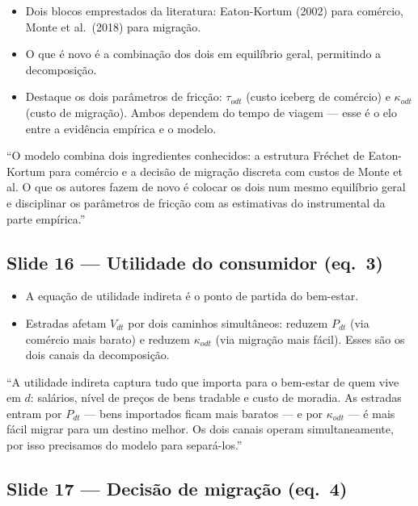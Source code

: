 \documentclass[12pt, a4paper]{article}
\begin{document}
\begin{itemize}
    \item Dois blocos emprestados da literatura: Eaton-Kortum (2002) para comércio, Monte et al.\ (2018) para migração.
    \item O que é novo é a combinação dos dois em equilíbrio geral, permitindo a decomposição.
    \item Destaque os dois parâmetros de fricção: $\tau_{odt}$ (custo iceberg de comércio) e $\kappa_{odt}$ (custo de migração). Ambos dependem do tempo de viagem --- esse é o elo entre a evidência empírica e o modelo.
\end{itemize}

\begin{mdframed}[style=sintese]
``O modelo combina dois ingredientes conhecidos: a estrutura Fréchet de Eaton-Kortum para comércio
e a decisão de migração discreta com custos de Monte et al. O que os autores fazem de novo é
colocar os dois num mesmo equilíbrio geral e disciplinar os parâmetros de fricção com as estimativas
do instrumental da parte empírica.''
\end{mdframed}

\subsection*{Slide 16 --- Utilidade do consumidor (eq.\ 3)}

\begin{itemize}
    \item A equação de utilidade indireta é o ponto de partida do bem-estar.
    \item Estradas afetam $V_{dt}$ por dois caminhos simultâneos: reduzem $P_{dt}$ (via comércio mais barato) e reduzem $\kappa_{odt}$ (via migração mais fácil). Esses são os dois canais da decomposição.
\end{itemize}

\begin{mdframed}[style=sintese]
``A utilidade indireta captura tudo que importa para o bem-estar de quem vive em $d$:
salários, nível de preços de bens tradable e custo de moradia. As estradas entram por $P_{dt}$
--- bens importados ficam mais baratos --- e por $\kappa_{odt}$ --- é mais fácil migrar para
um destino melhor. Os dois canais operam simultaneamente, por isso precisamos do modelo para separá-los.''
\end{mdframed}

\subsection*{Slide 17 --- Decisão de migração (eq.\ 4)}
\end{document}
